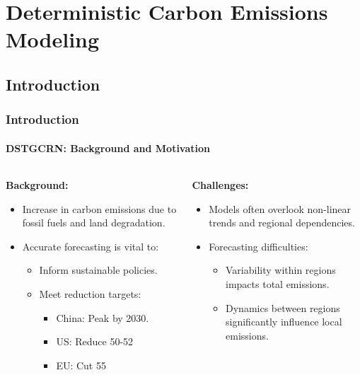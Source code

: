 \documentclass[light]{lutbeamer} %
\begin{document}

\section{Deterministic Carbon Emissions Modeling}
\subsection{Introduction}
\begin{frame}
    \frametitle{Introduction}
    \framesubtitle{DSTGCRN: Background and Motivation}
    \begin{columns}[T]
        \begin{column}{0.45\textwidth}
            \textbf{Background:}
            \begin{itemize}
                \item Increase in carbon emissions due to fossil fuels and land degradation.
                \item Accurate forecasting is vital to:
                      \begin{itemize}
                          \item Inform sustainable policies.
                          \item Meet reduction targets:
                                \begin{itemize}
                                    \item China: Peak by 2030.
                                    \item US: Reduce 50-52%
                                    \item EU: Cut 55%
                                \end{itemize}
                      \end{itemize}
            \end{itemize}
        \end{column}
        \begin{column}{0.45\textwidth}
            \textbf{Challenges:}
            \begin{itemize}
                \item Models often overlook non-linear trends and regional dependencies.
                \item Forecasting difficulties:
                      \begin{itemize}
                          \item Variability within regions impacts total emissions.
                          \item Dynamics between regions significantly influence local emissions.
                      \end{itemize}
            \end{itemize}
        \end{column}
    \end{columns}
\end{frame}
\end{document}
